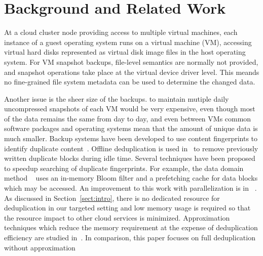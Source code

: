 
\section{Background and Related Work}
\label{sect:background}


At a cloud cluster node providing access to multiple virtual machines, each
instance of a guest operating system runs on a virtual machine (VM), accessing
virtual hard disks represented as virtual disk image files in the host
operating system. For VM snapshot backups, file-level semantics are normally
not provided, and snapshot operations take place at the virtual device driver
level.  This meands no fine-grained file system metadata can be used to
determine the changed data.

Another issue is the sheer size of the backups. to maintain mutiple daily
uncompressed snapshots of each VM would be very expensive, even though
most of the data remains the same from day to day, and even between VMs common
software packages and operating systems mean that the amount of unique data is
much smaller. Backup systems have been developed to use content fingerprints to
identify duplicate content~\cite{venti02,Rhea2008}. Offline deduplication is
used in~\cite{EMC,NetAppOffline} to remove previously written duplicate blocks
during idle time.  Several techniques have been proposed to speedup searching
of duplicate fingerprints. For example, the data domain method
~\cite{bottleneck08} uses  an in-memory Bloom filter and a prefetching cache
for data blocks  which may be accessed.  An improvement to this work with
parallelization is in ~\cite{MAD210,DEBAR}.  As discussed in
Section~\ref{sect:intro}, there is no dedicated resource for deduplication in
our targeted setting and low memory usage is required so that the resource
impact to other cloud services is minimized. Approximation techniques which
reduce the memory requirement at the expense of deduplication efficiency are
studied in~\cite{extreme_binning09,Guo2011,WeiZhangIEEE}.  In comparison, this
paper focuses on full deduplication without approximation




